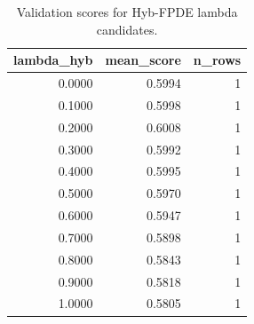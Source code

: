 \begin{table}[t]
\caption{Validation scores for Hyb-FPDE lambda candidates.}
\label{tab:lambda_distribution_computed}
\centering
\begin{tabular}{rrr}
\toprule
lambda\_hyb & mean\_score & n\_rows \\
\midrule
0.0000 & 0.5994 & 1 \\
0.1000 & 0.5998 & 1 \\
0.2000 & 0.6008 & 1 \\
0.3000 & 0.5992 & 1 \\
0.4000 & 0.5995 & 1 \\
0.5000 & 0.5970 & 1 \\
0.6000 & 0.5947 & 1 \\
0.7000 & 0.5898 & 1 \\
0.8000 & 0.5843 & 1 \\
0.9000 & 0.5818 & 1 \\
1.0000 & 0.5805 & 1 \\
\bottomrule
\end{tabular}

\end{table}
